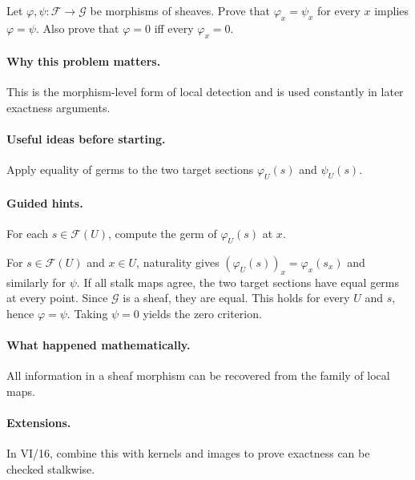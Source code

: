\begin{problem}
Let $\varphi,\psi:\mathcal F\to\mathcal G$ be morphisms of sheaves. Prove that $\varphi_x=\psi_x$ for every $x$ implies $\varphi=\psi$. Also prove that $\varphi=0$ iff every $\varphi_x=0$.
\end{problem}

\paragraph{Why this problem matters.}
This is the morphism-level form of local detection and is used constantly in later exactness arguments.

\paragraph{Useful ideas before starting.}
Apply equality of germs to the two target sections $\varphi_U(s)$ and $\psi_U(s)$.

\paragraph{Guided hints.}
For each $s\in\mathcal F(U)$, compute the germ of $\varphi_U(s)$ at $x$.

\ifdefined\FullProblemDossiers
\begin{solution}
For $s\in\mathcal F(U)$ and $x\in U$, naturality gives $(\varphi_U(s))_x=\varphi_x(s_x)$ and similarly for $\psi$. If all stalk maps agree, the two target sections have equal germs at every point. Since $\mathcal G$ is a sheaf, they are equal. This holds for every $U$ and $s$, hence $\varphi=\psi$. Taking $\psi=0$ yields the zero criterion.
\end{solution}

\paragraph{What happened mathematically.}
All information in a sheaf morphism can be recovered from the family of local maps.

\paragraph{Extensions.}
In VI/16, combine this with kernels and images to prove exactness can be checked stalkwise.
\fi
